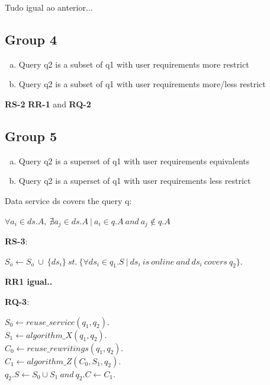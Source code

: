 \begin{definition}
Tudo igual ao anterior...
\end{definition}

\subsection{Group 4}

\begin{enumerate}[a)]
\item Query q2 is a subset of q1 with user requirements more restrict
\item Query q2 is a subset of q1 with user requirements more/less restrict
\end{enumerate}

\begin{definition}
\textbf{RS-2} \textbf{RR-1} and \textbf{RQ-2}
\end{definition}

\subsection{Group 5}
\begin{enumerate}[a)]
\item Query q2 is a superset of q1 with user requirements equivalents
\item Query q2 is a superset of q1 with user requirements less restrict
\end{enumerate}

\begin{definition}
Data service ds covers the query q: 
\begin{center}
$ \forall a_{i} \in ds.A,\ \nexists a_{j} \in ds.A \ \vert \ a_{i} \in q.A\ and\ a_{j} \notin q.A$
\end{center}
\end{definition}

\begin{definition}
\textbf{RS-3}:
\begin{flushleft}
$ S_{o} \leftarrow S_{o} \ \cup \ \lbrace ds_{i} \rbrace\  st.\ \lbrace \forall ds_{i} \in q_{1}.S\ \vert \ ds_{i} \ is \ online\ and\ ds_{i}\ covers\ q_{2} \rbrace$. \\
\end{flushleft}
\end{definition}

\textbf{RR1 igual..}

\begin{definition}
\textbf{RQ-3}:
\begin{flushleft}
$ S_{0} \leftarrow reuse\_service (q_{1}, q_{2})$. \\
$ S_{1} \leftarrow algorithm\_X (q_{1}, q_{2})$. \\
$ C_{0} \leftarrow reuse\_rewritings (q_{1}, q_{2})$. \\
$ C_{1} \leftarrow algorithm\_Z (C_{0}, S_{1}, q_{2})$. \\
$ q_{2}.S \leftarrow S_{0} \cup S_{1}\ and\ q_{2}.C \leftarrow C_{1}$.
\end{flushleft}
\end{definition}

